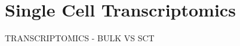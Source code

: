 \graphicspath{{chapters/4.Chapter_2/figures}}

\chapter{Single Cell Transcriptomics}

TRANSCRIPTOMICS - BULK VS SCT
